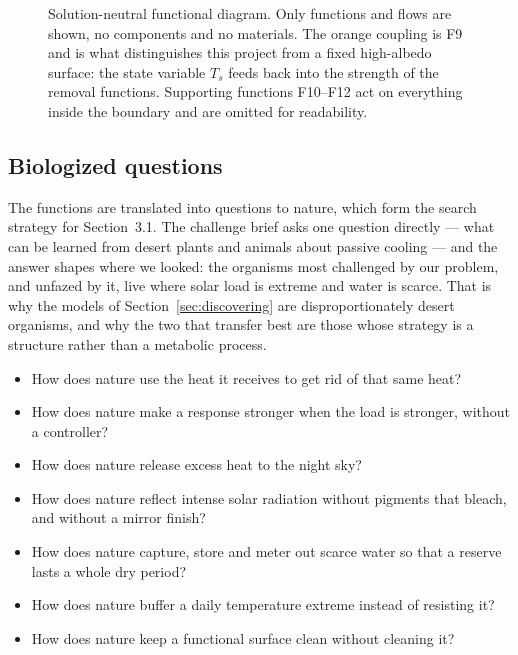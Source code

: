 \begin{figure}[htbp]
{}
\caption{Solution-neutral functional diagram. Only functions and flows are
shown, no components and no materials. The orange coupling is F9 and is what
distinguishes this project from a fixed high-albedo surface: the state variable
$T_s$ feeds back into the strength of the removal functions. Supporting
functions F10--F12 act on everything inside the boundary and are omitted for
readability.}
\label{fig:funcdiagram}
\end{figure}

\subsection{Biologized questions}
\label{sec:biologized}

The functions are translated into questions to nature, which form the search
strategy for Section~3.1. The challenge brief asks one question directly --- what
can be learned from desert plants and animals about passive cooling --- and the
answer shapes where we looked: the organisms most challenged by our problem, and
unfazed by it, live where solar load is extreme and water is scarce. That is why
the models of Section~\ref{sec:discovering} are disproportionately desert
organisms, and why the two that transfer best are those whose strategy is a
structure rather than a metabolic process.

\begin{itemize}
  \item How does nature use the heat it receives to get rid of that same heat?
  \item How does nature make a response stronger when the load is stronger,
        without a controller?
  \item How does nature release excess heat to the night sky?
  \item How does nature reflect intense solar radiation without pigments that
        bleach, and without a mirror finish?
  \item How does nature capture, store and meter out scarce water so that a
        reserve lasts a whole dry period?
  \item How does nature buffer a daily temperature extreme instead of resisting
        it?
  \item How does nature keep a functional surface clean without cleaning it?
\end{itemize}

